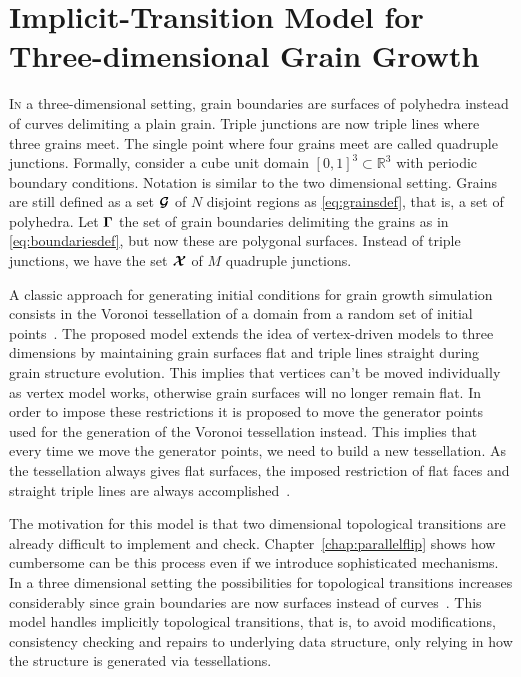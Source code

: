 \chapter{Implicit-Transition Model for Three-dimensional Grain Growth}
\label{chap:implicit}

\lettrine{I}{n} a three-dimensional setting, grain boundaries are surfaces of polyhedra instead of curves delimiting a plain grain. 
Triple junctions are now triple lines where three grains meet. The single point where four grains meet are called quadruple junctions. 
Formally, consider a cube unit domain $[0,1]^3 \subset \mathbb{R}^3$ with periodic boundary conditions. 
Notation is similar to the two dimensional setting. Grains are still defined as a set $\bm{\mathcal{G}} $ of $N$ disjoint regions as \eqref{eq:grainsdef}, that is, a set of polyhedra. 
Let $\bm{\Gamma}$ the set of grain boundaries delimiting the grains as in \eqref{eq:boundariesdef}, but now these are polygonal surfaces. 
Instead of triple junctions, we have the set $\bm{\mathcal{X}}$ of $M$ quadruple junctions.

A classic approach for generating initial conditions for grain growth simulation consists in the Voronoi tessellation of a domain from a random set of initial points~\cite{Barmak2013,BarralesMora2008,Kinderlehrer2006,Lazar2011,Syha2010,torres2015}. 
The proposed model extends the idea of vertex-driven models to three dimensions by maintaining grain surfaces flat and triple lines straight during grain structure evolution. 
This implies that vertices can't be moved individually as vertex model works, otherwise grain surfaces will no longer remain flat. %
In order to impose these restrictions it is proposed to move the generator points used for the generation of the Voronoi tessellation instead. This implies that every time we move the generator points, we need to build a new tessellation. 
As the tessellation always gives flat surfaces, the imposed restriction of flat faces and straight triple lines are always accomplished~\cite{sazo2017implicit}.

The motivation for this model is that two dimensional topological transitions are already difficult to implement and check. Chapter~\ref{chap:parallelflip} shows how cumbersome can be this process even if we introduce sophisticated mechanisms. 
In a three dimensional setting the possibilities for topological transitions increases considerably since grain boundaries are now surfaces instead of curves~\cite{BarralesMora2008}. 
This model handles implicitly topological transitions, that is, to avoid modifications, consistency checking and repairs to underlying data structure, only relying in how the structure is generated via tessellations.

